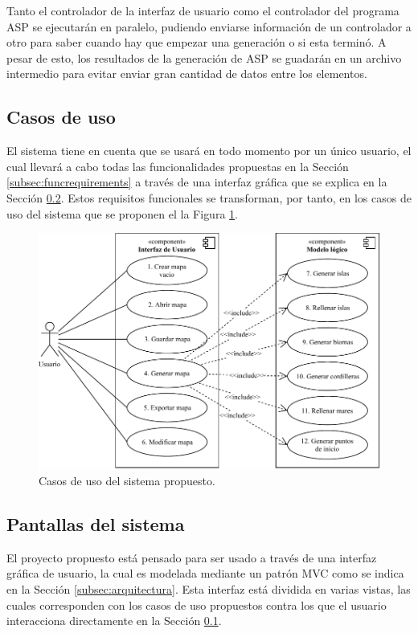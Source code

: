 Tanto el controlador de la interfaz de usuario como el controlador del programa ASP se ejecutarán en paralelo, pudiendo enviarse información de un controlador a otro para saber cuando hay que empezar una generación o si esta terminó. A pesar de esto, los resultados de la generación de ASP se guadarán en un archivo intermedio para evitar enviar gran cantidad de datos entre los elementos.

\subsection{Casos de uso}
\label{subsec:cases}

El sistema tiene en cuenta que se usará en todo momento por un único usuario, el cual llevará a cabo todas las funcionalidades propuestas en la Sección \ref{subsec:funcrequirements} a través de una interfaz gráfica que se explica en la Sección \ref{subsec:mockups}. Estos requisitos funcionales se transforman, por tanto, en los casos de uso del sistema que se proponen el la Figura \ref{fig:cases}.

\begin{figure}[!h]
	\centering
	\includegraphics[width=\textwidth]{images/casos-de-uso.pdf}
	\caption{Casos de uso del sistema propuesto.}
	\label{fig:cases}
\end{figure}

\subsection{Pantallas del sistema}
\label{subsec:mockups}

El proyecto propuesto está pensado para ser usado a través de una interfaz gráfica de usuario, la cual es modelada mediante un patrón MVC como se indica en la Sección \ref{subsec:arquitectura}. Esta interfaz está dividida en varias vistas, las cuales corresponden con los casos de uso propuestos contra los que el usuario interacciona directamente en la Sección \ref{subsec:cases}.

